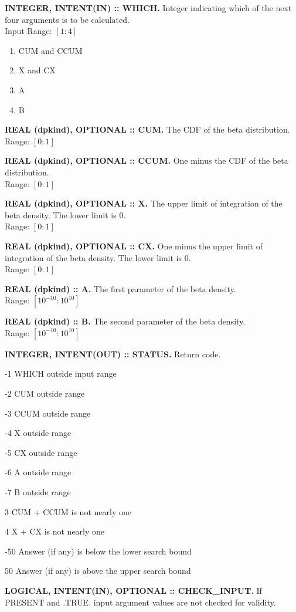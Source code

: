 \documentclass[12pt,dvips]{article}
\newcommand{\range}[2]{\hfill Range: \ensuremath{\left[ #1:#2
\right]}\\}
\newcommand{\inrange}[2]{\hfill Input Range: \ensuremath{\left[ #1:#2
\right]}\\}
\newcommand{\bdf}{10^{10}}
\newcommand{\sprob}{10^{-10}}
\newcommand{\myitem}[1]{\item{\bf \color{Violet} #1 \normalcolor}}
\begin{document}
\begin{description}

\myitem{INTEGER, INTENT(IN)  :: WHICH.} Integer indicating  which of the
next four arguments is to be calculated.\\
\inrange{1}{4}
\begin{enumerate}
\item CUM and CCUM
\item X and CX
\item A
\item B
\end{enumerate}

\myitem{REAL (dpkind), OPTIONAL :: CUM.} The CDF of the beta distribution.\\
\range{0}{1}

\myitem{REAL (dpkind), OPTIONAL :: CCUM.} One minus the CDF of the
beta distribution.\\
\range{0}{1}

\myitem{REAL (dpkind), OPTIONAL :: X.}  The upper limit of integration of
the beta density.  The lower limit is 0.\\
\range{0}{1}

\myitem{REAL (dpkind),  OPTIONAL :: CX.}   One minus the upper  limit of
integration of the beta density.  The lower limit is 0.\\ \range{0}{1}

\myitem{REAL (dpkind) :: A.}  The first parameter of the beta density.\\
\range{\sprob}{\bdf}

\myitem{REAL (dpkind) :: B.}  The second parameter of the beta density.\\
\range{\sprob}{\bdf}

\myitem{INTEGER, INTENT(OUT) :: STATUS.} Return code.
\begin{description}
\item{-1}  WHICH outside input range
\item{-2}  CUM outside range
\item{-3}  CCUM outside range
\item{-4}  X outside range
\item{-5}  CX outside range
\item{-6}  A outside range
\item{-7}  B outside range
\item{3} CUM + CCUM is not nearly one
\item{4} X + CX is not nearly one
\item{-50} Answer (if any) is below the lower search bound
\item{50} Answer (if any) is above the upper search bound
\end{description}

\myitem{LOGICAL, INTENT(IN), OPTIONAL :: CHECK\_INPUT.}  If PRESENT
and .TRUE. input argument values are not checked for validity.

\end{description}
\end{document}
